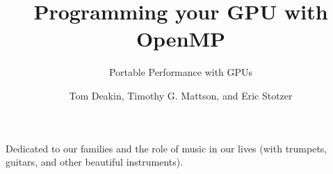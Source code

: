 %
\title{Programming your GPU with OpenMP}
\subtitle{Portable Performance with GPUs}
\author{Tom Deakin, Timothy G. Mattson, and Eric Stotzer}
\booktitlepage
 


 
 
\printtitlepage
 
 

 
 
\newpage
\thispagestyle{empty}
\begin{center}
Dedicated to our families and the role of music in our lives (with trumpets, guitars, and other beautiful instruments). 
\end{center}
 
 
\newpage
\thispagestyle{empty}
\mbox{ }
\newpage
 

\tableofcontents
 
 
 
 
